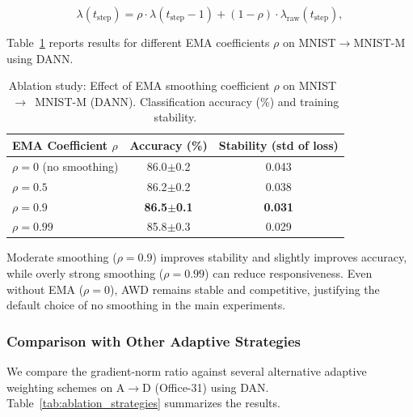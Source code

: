 \documentclass[pdflatex,sn-mathphys-num]{sn-jnl}
\theoremstyle{thmstyleone}
\theoremstyle{thmstyletwo}
\theoremstyle{thmstylethree}
\begin{document}
\begin{equation}
\lambda(t_{\text{step}}) = \rho \cdot \lambda(t_{\text{step}}-1) + (1 - \rho) \cdot \lambda_{\text{raw}}(t_{\text{step}}),
\label{eq:ema_lambda}
\end{equation}

Table~\ref{tab:ablation_ema} reports results for different EMA coefficients $\rho$ on MNIST$\to$MNIST-M using DANN.

\begin{table}[t]
    \centering
    \caption{Ablation study: Effect of EMA smoothing coefficient $\rho$ on MNIST~$\to$~MNIST-M (DANN). Classification accuracy (\%) and training stability.}
    \label{tab:ablation_ema}
    \begin{tabular}{lcc}
        \toprule
        \textbf{EMA Coefficient} $\rho$ & \textbf{Accuracy (\%)} & \textbf{Stability (std of loss)} \\
        \midrule
        $\rho = 0$ (no smoothing) & 86.0$\pm$0.2 & 0.043 \\
        $\rho = 0.5$ & 86.2$\pm$0.2 & 0.038 \\
        $\rho = 0.9$ & \textbf{86.5$\pm$0.1} & \textbf{0.031} \\
        $\rho = 0.99$ & 85.8$\pm$0.3 & 0.029 \\
        \bottomrule
    \end{tabular}
\end{table}

Moderate smoothing ($\rho=0.9$) improves stability and slightly improves accuracy, while overly strong smoothing ($\rho=0.99$) can reduce responsiveness.
Even without EMA ($\rho=0$), AWD remains stable and competitive, justifying the default choice of no smoothing in the main experiments.

\subsubsection{Comparison with Other Adaptive Strategies}

We compare the gradient-norm ratio against several alternative adaptive weighting schemes on A$\to$D (Office-31) using DAN.
Table~\ref{tab:ablation_strategies} summarizes the results.
\end{document}

